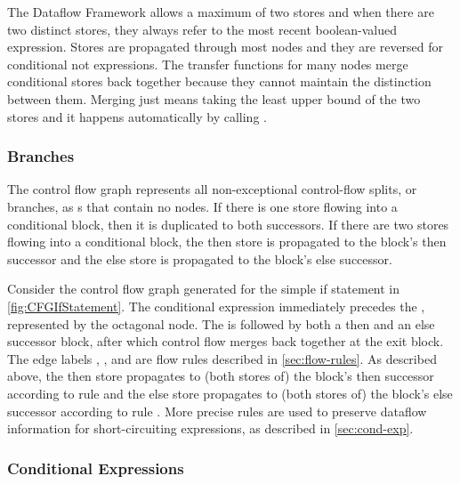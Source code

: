 The Dataflow Framework allows a maximum of two stores and when there
are two distinct stores, they always refer to the most recent
boolean-valued expression.  Stores are propagated through most nodes
and they are reversed for conditional not expressions.  The transfer
functions for many nodes merge conditional stores back together
because they cannot maintain the distinction between them.  Merging
just means taking the least upper bound of the two stores and it
happens automatically by calling .


\subsubsection{Branches}

The control flow graph represents all non-exceptional control-flow
splits, or branches, as s that contain no
nodes.  If there is one store flowing into a conditional block, then
it is duplicated to both successors.  If there are two stores flowing
into a conditional block, the then store is propagated to the block's
then successor and the else store is propagated to the block's else
successor.

Consider the control flow graph generated for the simple if statement
in \autoref{fig:CFGIfStatement}.  The conditional expression 
immediately precedes the , represented by the
octagonal node.  The  is followed by both a
then and an else successor block, after which control flow merges back
together at the exit block.  The edge labels ,
, and  are flow rules described
in \autoref{sec:flow-rules}.  As described above, the then store
propagates to (both stores of) the block's then successor according to
rule  and the else store propagates to (both stores
of) the block's else successor according to rule .
More precise rules are used to preserve dataflow information for
short-circuiting expressions, as described in \autoref{sec:cond-exp}.


\subsubsection{Conditional Expressions}
\label{sec:cond-exp}


